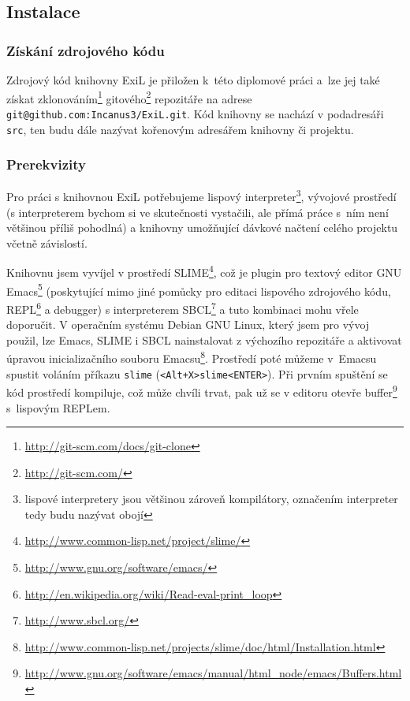 \subsection{Instalace}
\subsubsection{Získání zdrojového kódu}
Zdrojový kód knihovny ExiL je přiložen k~této diplomové práci a~lze jej také získat
zklonováním\footnote{\url{http://git-scm.com/docs/git-clone}}
gitového\footnote{\url{http://git-scm.com/}} repozitáře na adrese
\verb|git@github.com:Incanus3/ExiL.git|.
Kód knihovny se nachází v podadresáři \verb|src|, ten budu dále nazývat kořenovým
adresářem knihovny či projektu.

\subsubsection{Prerekvizity}
Pro práci s knihovnou ExiL potřebujeme lispový
interpreter\footnote{lispové interpretery jsou většinou zároveň
kompilátory, %
označením interpreter tedy budu nazývat obojí}, vývojové prostředí (s
interpreterem bychom si ve skutečnosti vystačili, ale přímá práce s~ním není
většinou příliš pohodlná) a knihovny umožňující dávkové načtení celého projektu
včetně závislostí.

Knihovnu jsem vyvíjel v prostředí
SLIME\footnote{\url{http://www.common-lisp.net/project/slime/}}, což je plugin
pro textový editor GNU Emacs\footnote{\url{http://www.gnu.org/software/emacs/}}
(poskytující mimo jiné pomůcky pro editaci lispového zdrojového kódu,
REPL\footnote{\url{http://en.wikipedia.org/wiki/Read-eval-print\_loop}} a
debugger) %
s interpreterem SBCL\footnote{\url{http://www.sbcl.org/}} a tuto kombinaci
mohu vřele doporučit. V operačním systému Debian GNU Linux, který jsem pro vývoj
použil, lze Emacs, SLIME i SBCL nainstalovat z výchozího repozitáře a aktivovat
úpravou inicializačního souboru
Emacsu\footnote{\url{http://www.common-lisp.net/projects/slime/doc/html/Installation.html}}.
Prostředí poté můžeme v~Emacsu spustit voláním příkazu \verb|slime|
(\verb|<Alt+X>slime<ENTER>|). Při prvním spuštění se kód prostředí kompiluje, což
může chvíli trvat, pak už se v editoru otevře
buffer\footnote{\url{http://www.gnu.org/software/emacs/manual/html\_node/emacs/Buffers.html}}
s~lispovým REPLem.

